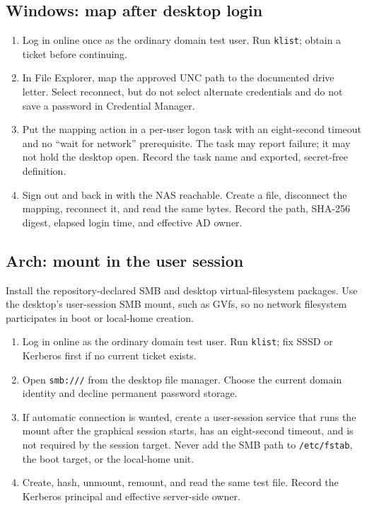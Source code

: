 \subsection*{Windows: map after desktop login}

\begin{enumerate}
\item Log in online once as the ordinary domain test user. Run
\texttt{klist}; obtain a ticket before continuing.
\item In File Explorer, map the approved UNC path to the documented drive
letter. Select reconnect, but do not select alternate credentials and do not
save a password in Credential Manager.
\item Put the mapping action in a per-user logon task with an eight-second
timeout and no ``wait for network'' prerequisite. The task may report failure;
it may not hold the desktop open. Record the task name and exported,
secret-free definition.
\item Sign out and back in with the NAS reachable. Create a file, disconnect
the mapping, reconnect it, and read the same bytes. Record the path, SHA-256
digest, elapsed login time, and effective AD owner.
\end{enumerate}


\subsection*{Arch: mount in the user session}

Install the repository-declared SMB and desktop virtual-filesystem packages.
Use the desktop's user-session SMB mount, such as GVfs, so no network
filesystem participates in boot or local-home creation.

\begin{enumerate}
\item Log in online as the ordinary domain test user. Run \texttt{klist}; fix
SSSD or Kerberos first if no current ticket exists.
\item Open \texttt{smb:///}
from the desktop file manager. Choose the current domain identity and decline
permanent password storage.
\item If automatic connection is wanted, create a user-session service that
runs the mount after the graphical session starts, has an eight-second
timeout, and is not required by the session target. Never add the SMB path to
\texttt{/etc/fstab}, the boot target, or the local-home unit.
\item Create, hash, unmount, remount, and read the same test file. Record the
Kerberos principal and effective server-side owner.
\end{enumerate}

